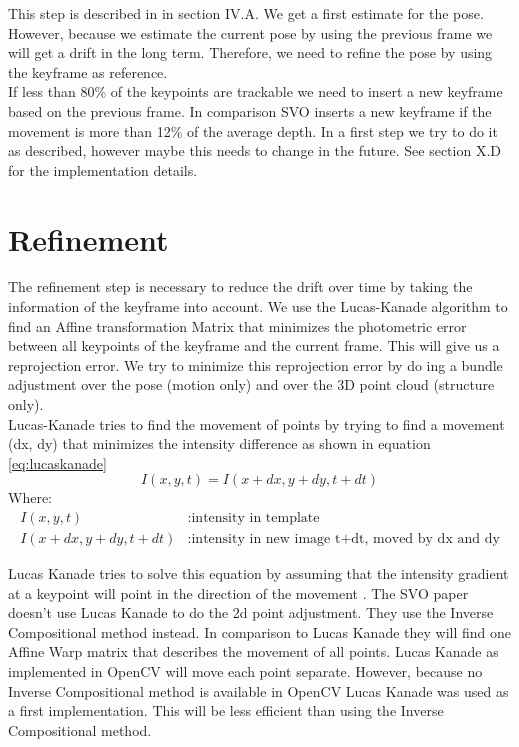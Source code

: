 \documentclass[11pt,a4paper,titlepage,oneside]{report}
\begin{document}
This step is described in \cite{svo2} in section IV.A. We get a first estimate for the pose. However, because we estimate the current pose by using the previous frame we will get a drift in the long term. Therefore, we need to refine the pose by using the keyframe as reference.\\
If less than 80\% of the keypoints are trackable we need to insert a new keyframe based on the previous frame. In comparison SVO inserts a new keyframe if the movement is more than 12\% of the average depth. In a first step we try to do it as described, however maybe this needs to change in the future. See \cite{svo2} section X.D for the implementation details.

\section{Refinement}\label{sec:refinement}

The refinement step is necessary to reduce the drift over time by taking the information of the keyframe into account. We use the Lucas-Kanade algorithm to find an Affine transformation Matrix that minimizes the photometric error between all keypoints of the keyframe and the current frame. This will give us a reprojection error. We try to minimize this reprojection error by do ing a bundle adjustment over the pose (motion only) and over the 3D point cloud (structure only).\\

Lucas-Kanade tries to find the movement of points by trying to find a movement (dx, dy) that minimizes the intensity difference as shown in equation \ref{eq:lucaskanade}
\begin{equation}\label{eq:lucaskanade}
	I(x,y,t)=I(x+dx, y+dy, t+dt)
\end{equation}
Where:
\begin{align*}
	I(x,y,t)						&:	\text{intensity in template}\\
	I(x+dx, y+dy, t+dt) &:	\text{intensity in new image t+dt, moved by dx and dy}
\end{align*}

Lucas Kanade tries to solve this equation by assuming that the intensity gradient at a keypoint will point in the direction of the movement \cite{lucas_kanade}. The SVO paper doesn't use Lucas Kanade to do the 2d point adjustment. They use the Inverse Compositional method instead. In comparison to Lucas Kanade they will find one Affine Warp matrix that describes the movement of all points. Lucas Kanade as implemented in OpenCV will move each point separate. However, because no Inverse Compositional method is available in OpenCV Lucas Kanade was used as a first implementation. This will be less efficient than using the Inverse Compositional method.
\end{document}
